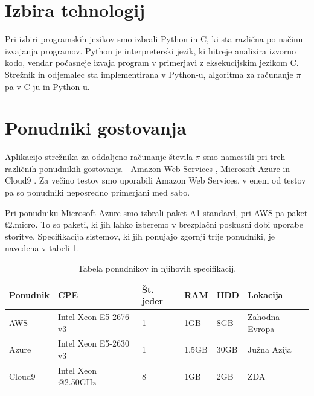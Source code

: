 \section{Izbira tehnologij} \label{3_tehnologije}

Pri izbiri programskih jezikov smo izbrali Python in C, ki sta različna po načinu izvajanja programov.
Python je interpreterski jezik, ki hitreje analizira izvorno kodo, vendar počasneje izvaja program v primerjavi z eksekucijskim jezikom C.
Strežnik in odjemalec sta implementirana v Python-u, algoritma za računanje \(\pi\) pa v C-ju in Python-u.



\section{Ponudniki gostovanja} \label{3_ponudniki}

Aplikacijo strežnika za oddaljeno računanje števila \(\pi\) smo namestili pri treh različnih ponudnikih gostovanja - Amazon Web Services \cite{3_aws}, Microsoft Azure \cite{3_azure} in Cloud9 \cite{3_c9io}.
Za večino testov smo uporabili Amazon Web Services, v enem od testov pa so ponudniki neposredno primerjani med sabo.

Pri ponudniku Microsoft Azure smo izbrali paket A1 standard, pri AWS pa paket t2.micro.
To so paketi, ki jih lahko izberemo v brezplačni poskusni dobi uporabe storitve.
Specifikacija sistemov, ki jih ponujajo zgornji trije ponudniki, je navedena v tabeli \ref{3_tabela_specifikacij}.

\begin{table}[H]
    \centering
    \begin{tabular}{|p{1.4cm}|p{3.4cm}|p{1.4cm}|p{1.0cm}|p{0.9cm}|p{1.4cm}|}
        \hline
        Ponudnik  & CPE                    & Št. jeder  & RAM    & HDD   & Lokacija        \\
        \hline
        \hline
        AWS       & Intel Xeon E5-2676 v3  & 1          & 1GB    & 8GB   & Zahodna Evropa  \\
        \hline
        Azure     & Intel Xeon E5-2630 v3  & 1          & 1.5GB  & 30GB  & Južna Azija     \\
        \hline
        Cloud9    & Intel Xeon @2.50GHz    & 8          & 1GB    & 2GB   & ZDA             \\
        \hline
    \end{tabular}
    \caption{Tabela ponudnikov in njihovih specifikacij.}
    \label{3_tabela_specifikacij}
\end{table}



